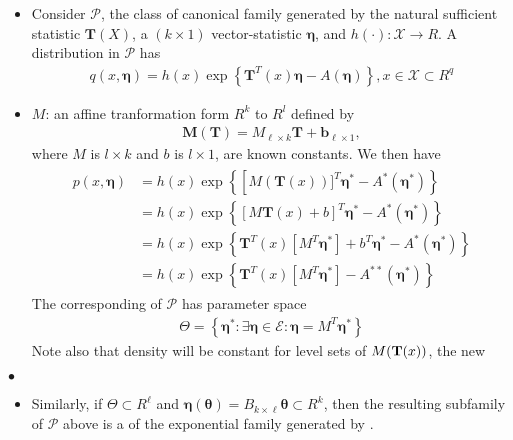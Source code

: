 \documentclass{article}
\begin{document}
\begin{itemize}
    \item Consider $\mathcal{P}$, the class of canonical family generated by the natural sufficient statistic $\mathbf{T}(X)$, a $(k \times 1)$ vector-statistic $\boldsymbol{\eta}$, and $h(\cdot): \mathcal{X} \rightarrow R $. A distribution in $\mathcal{P}$ has 
    \begin{align*}
q(x, \boldsymbol{\eta})=h(x) \exp \left\{\mathbf{T}^{T}(x) \boldsymbol{\eta}-A(\boldsymbol{\eta})\right\}, x \in \mathcal{X} \subset R^{q}
\end{align*}
\item $M$: an affine tranformation form $R^{k}$ to $R^{l}$ defined by
\begin{align*}
\mathbf{M}(\mathbf{T})=M_{\ell \times k} \mathbf{T}+\mathbf{b}_{\ell \times 1},
\end{align*}
where $M$ is $l \times k$ and $b$ is $l \times 1$, are known constants.
We then have
\begin{align*}
\begin{aligned}
p(x, \boldsymbol{\eta}) &=h(x) \exp \left\{\left[M(\mathbf{T}(x))]^{T} \boldsymbol{\eta}^{*}-A^{*}\left(\boldsymbol{\eta}^{*}\right)\right\}\right.\\
&=h(x) \exp \left\{[M \mathbf{T}(x)+b]^{T} \boldsymbol{\eta}^{*}-A^{*}\left(\boldsymbol{\eta}^{*}\right)\right\} \\
&=h(x) \exp \left\{\mathbf{T}^{T}(x)\left[M^{T} \boldsymbol{\eta}^{*}\right]+b^{T} \boldsymbol{\eta}^{*}-A^{*}\left(\boldsymbol{\eta}^{*}\right)\right\}\\
&=h(x) \exp \left\{\mathbf{T}^{T}(x)\left[M^{T} \boldsymbol{\eta}^{*}\right]-A^{* *}\left(\boldsymbol{\eta}^{*}\right)\right\}
\end{aligned}
\end{align*}
The corresponding  of $\mathcal{P}$  has parameter space
\begin{align*}
\Theta=\left\{\boldsymbol{\eta}^{*}: \exists \boldsymbol{\eta} \in \mathcal{E}: \boldsymbol{\eta}=M^{T} \boldsymbol{\eta}^{*}\right\}
\end{align*} 
Note also that density will be constant for level sets of $M(\mathbf{T}(x))$,  the new  
\end{itemize}
$\bullet$ 
\begin{itemize}
    \item Similarly, if $\Theta \subset R^{\ell}$ and $\boldsymbol{\eta}(\boldsymbol{\theta})=B_{k \times \ell} \boldsymbol{\theta} \subset R^{k}$, then the resulting subfamily of $\mathcal{P}$ above is a  of the exponential family generated by . 
\end{itemize}
\end{document}
